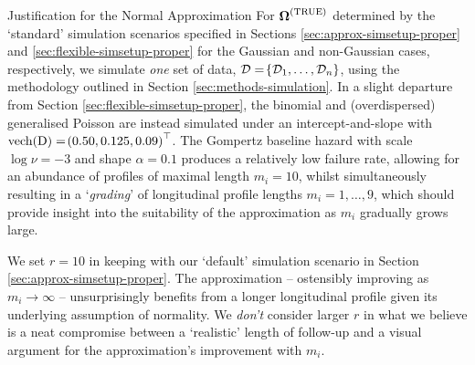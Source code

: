 \begin{chapter}{\label{cha:justification}Justification for the Normal Approximation}
  For $\bm{\mathrm{\Omega}}^{(\mathrm{TRUE})}$ determined by the `standard' simulation scenarios specified in Sections \ref{sec:approx-simsetup-proper} and \ref{sec:flexible-simsetup-proper} for the Gaussian and non-Gaussian cases, respectively, we simulate \textit{one} set of data, $\mathcal{D}=\!\left\{\mathcal{D}_1,\dots,\mathcal{D}_n\right\}$, using the methodology outlined in Section \ref{sec:methods-simulation}. In a slight departure from Section \ref{sec:flexible-simsetup-proper}, the binomial and (overdispersed) generalised Poisson are instead simulated under an intercept-and-slope with $\text{vech}\!\left(\mathrm{D}\right)=\!\left(0.50,0.125,0.09\right)^\top$. The Gompertz baseline hazard with scale $\log\nu=-3$ and shape $\alpha=0.1$ produces a relatively low failure rate, allowing for an abundance of profiles of maximal length $m_i=10$, whilst simultaneously resulting in a `\textit{grading}' of longitudinal profile lengths $m_i=1,\dots,9$, which should provide insight into the suitability of the approximation as $m_i$ gradually grows large.

  \begin{remark}
      We set $r=10$ in keeping with our `default' simulation scenario in Section \ref{sec:approx-simsetup-proper}. The approximation -- ostensibly improving as $m_i\rightarrow\infty$ -- unsurprisingly benefits from a longer longitudinal profile given its underlying assumption of normality. We \textit{don't} consider larger $r$ in what we believe is a neat compromise between a `realistic' length of follow-up and a visual argument for the approximation's improvement with $m_i$.
  \end{remark}


\end{chapter}
